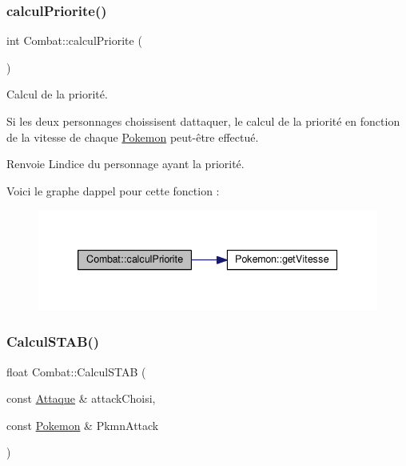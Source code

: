 \subsubsection{\texorpdfstring{calcul\+Priorite()}{calculPriorite()}}
{\footnotesize\ttfamily int Combat\+::calcul\+Priorite (\begin{DoxyParamCaption}{ }\end{DoxyParamCaption})}



Calcul de la priorité. 

Si les deux personnages choissisent d\textquotesingle{}attaquer, le calcul de la priorité en fonction de la vitesse de chaque \hyperlink{class_pokemon}{Pokemon} peut-\/être effectué. \begin{DoxyReturn}{Renvoie}
L\textquotesingle{}indice du personnage ayant la priorité. 
\end{DoxyReturn}
Voici le graphe d\textquotesingle{}appel pour cette fonction \+:\nopagebreak
\begin{figure}[H]
\begin{center}
\leavevmode
\includegraphics[width=339pt]{class_combat_ad1fb106750152c5008a04efc5b2b432d_cgraph}
\end{center}
\end{figure}
\mbox{\label{class_combat_a08f55247e72fa775222b4f0dcc210f23}} 
\subsubsection{\texorpdfstring{Calcul\+S\+T\+A\+B()}{CalculSTAB()}}
{\footnotesize\ttfamily float Combat\+::\+Calcul\+S\+T\+AB (\begin{DoxyParamCaption}\item[{const \hyperlink{class_attaque}{Attaque} \&}]{attack\+Choisi,  }\item[{const \hyperlink{class_pokemon}{Pokemon} \&}]{Pkmn\+Attack }\end{DoxyParamCaption})\hspace{0.3cm}{\ttfamily [private]}}



